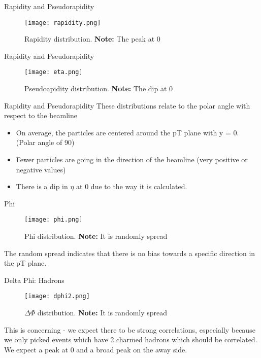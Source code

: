 \documentclass[10pt]{beamer}
\begin{document}
\begin{frame}{Rapidity and Pseudorapidity}
    \begin{figure}
        \centering
        \texttt{[image: rapidity.png]}
        \caption{Rapidity distribution. \textbf{Note:} The peak at 0}
    \end{figure}
\end{frame}

\begin{frame}{Rapidity and Pseudorapidity}
    \begin{figure}
        \centering
        \texttt{[image: eta.png]}
        \caption{Pseudoapidity distribution. \textbf{Note:} The dip at 0}
    \end{figure}
\end{frame}

\begin{frame}{Rapidity and Pseudorapidity}
These distributions relate to the polar angle with respect to the beamline
    \begin{itemize}
        \item On average, the particles are centered around the pT plane with y = 0. (Polar angle of 90)
        \item Fewer particles are going in the direction of the beamline (very positive or negative values)
        \item There is a dip in $\eta$ at 0 due to the way it is calculated.
    \end{itemize}
\end{frame}

\begin{frame}{Phi}
\begin{figure}
    \centering
    \texttt{[image: phi.png]}
    \caption{Phi distribution. \textbf{Note:} It is randomly spread}
\end{figure}

The random spread indicates that there is no bias towards a specific direction in the pT plane.
\end{frame}

\begin{frame}{Delta Phi: Hadrons}
\begin{figure}
    \centering
    \texttt{[image: dphi2.png]}
    \caption{$\Delta\Phi$ distribution. \textbf{Note:} It is randomly spread}
\end{figure}

This is concerning - we expect there to be strong correlations, especially because we only picked events which have 2 charmed hadrons which should be correlated. We expect a peak at 0 and a broad peak on the away side.
\end{frame}
\end{document}
